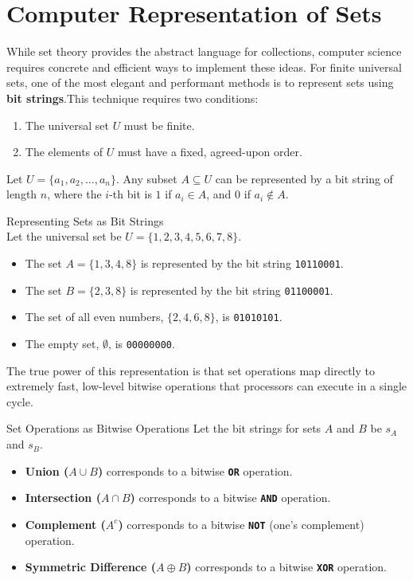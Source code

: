 \section{Computer Representation of Sets}
While set theory provides the abstract language for collections, computer science requires concrete and efficient ways to implement these ideas. For finite universal sets, one of the most elegant and performant methods is to represent sets using \textbf{bit strings}.This technique requires two conditions:
\begin{enumerate}
    \item The universal set $U$ must be finite.
    \item The elements of $U$ must have a fixed, agreed-upon order.
\end{enumerate}

Let $U = \{a_1, a_2, \dots, a_n\}$. Any subset $A \subseteq U$ can be represented by a bit string of length $n$, where the $i$-th bit is $1$ if $a_i \in A$, and $0$ if $a_i \notin A$.

\begin{example}{Representing Sets as Bit Strings}\\
    Let the universal set be $U = \{1, 2, 3, 4, 5, 6, 7, 8\}$.
    \begin{itemize}
        \item The set $A = \{1, 3, 4, 8\}$ is represented by the bit string \texttt{10110001}.
        \item The set $B = \{2, 3, 8\}$ is represented by the bit string \texttt{01100001}.
        \item The set of all even numbers, $\{2, 4, 6, 8\}$, is \texttt{01010101}.
        \item The empty set, $\emptyset$, is \texttt{00000000}.
    \end{itemize}
\end{example}

The true power of this representation is that set operations map directly to extremely fast, low-level bitwise operations that processors can execute in a single cycle.

\begin{custombox}{Set Operations as Bitwise Operations}
    Let the bit strings for sets $A$ and $B$ be $s_A$ and $s_B$.
    \begin{itemize}
        \item \textbf{Union ($A \cup B$)} corresponds to a bitwise \textbf{\texttt{OR}} operation.
        \item \textbf{Intersection ($A \cap B$)} corresponds to a bitwise \textbf{\texttt{AND}} operation.
        \item \textbf{Complement ($A^c$)} corresponds to a bitwise \textbf{\texttt{NOT}} (one's complement) operation.
        \item \textbf{Symmetric Difference ($A \oplus B$)} corresponds to a bitwise \textbf{\texttt{XOR}} operation.
    \end{itemize}
\end{custombox}

